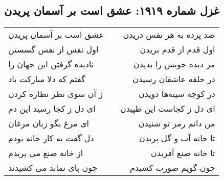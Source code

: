 \begin{center}
\section*{غزل شماره ۱۹۱۹: عشق است بر آسمان پریدن}
\label{sec:1919}
\begin{longtable}{l p{0.5cm} r}
عشق است بر آسمان پریدن
&&
صد پرده به هر نفس دریدن
\\
اول نفس از نفس گسستن
&&
اول قدم از قدم بریدن
\\
نادیده گرفتن این جهان را
&&
مر دیده خویش را بدیدن
\\
گفتم که دلا مبارکت باد
&&
در حلقه عاشقان رسیدن
\\
ز آن سوی نظر نظاره کردن
&&
در کوچه سینه‌ها دویدن
\\
ای دل ز کجا رسید این دم
&&
ای دل ز کجاست این طپیدن
\\
ای مرغ بگو زبان مرغان
&&
من دانم رمز تو شنیدن
\\
دل گفت به کار خانه بودم
&&
تا خانه آب و گل پریدن
\\
از خانه صنع می پریدم
&&
تا خانه صنع آفریدن
\\
چون پای نماند می کشیدند
&&
چون گویم صورت کشیدم
\\
\end{longtable}
\end{center}
